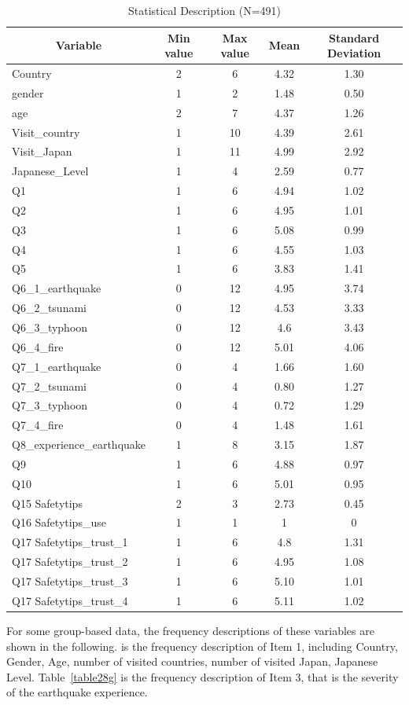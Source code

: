 \begin{table}[h]
  \caption[Statistical Description]{Statistical Description (N=491)}
  \label{table27}
  \centering
  \begin{tabular}{l|cccc}
 \hline
\multicolumn{1}{c|}{Variable} & Min value  & Max value & Mean & Standard Deviation \\
 \hline
Country	& 2&6&4.32&1.30\\
gender&1&2&1.48&0.50\\
age&2&7&4.37&1.26\\
Visit\_country&1&10&4.39&2.61\\
Visit\_Japan&1&11&4.99&2.92\\
Japanese\_Level&1&4&2.59&0.77\\
Q1&1&6&4.94&1.02\\
Q2&1&6&4.95&1.01\\
Q3&1&6&5.08&0.99\\
Q4&1&6&4.55&1.03\\
Q5&1&6&3.83&1.41\\
Q6\_1\_earthquake&0&12&4.95&3.74\\
Q6\_2\_tsunami&0&12&4.53&3.33\\
Q6\_3\_typhoon&0&12&4.6&3.43\\
Q6\_4\_fire&0&12&5.01&4.06\\
Q7\_1\_earthquake&0&4&1.66&1.60\\
Q7\_2\_tsunami&0&4&0.80&1.27\\
Q7\_3\_typhoon&0&4&0.72&1.29\\
Q7\_4\_fire&0&4&1.48&1.61\\
Q8\_experience\_earthquake&1&8&3.15& 1.87\\
Q9&1&6&4.88&0.97\\
Q10	&1&6&5.01&0.95\\
Q15 Safetytips&2&3&2.73&0.45\\
Q16 Safetytips\_use&1&1&1&0\\
Q17 Safetytips\_trust\_1&1&6&4.8&1.31\\
Q17 Safetytips\_trust\_2&1&6&4.95&1.08\\
Q17 Safetytips\_trust\_3&1&6&5.10&1.01\\
Q17 Safetytips\_trust\_4&1&6&5.11&1.02\\
 \hline
  \end{tabular}
\end{table}

For some group-based data, the frequency descriptions of these variables are shown in the following.  is the frequency description of Item 1, including Country, Gender, Age, number of visited countries, number of visited Japan, Japanese Level. Table~\ref{table28g} is the frequency description of Item 3, that is the severity of the earthquake experience.

